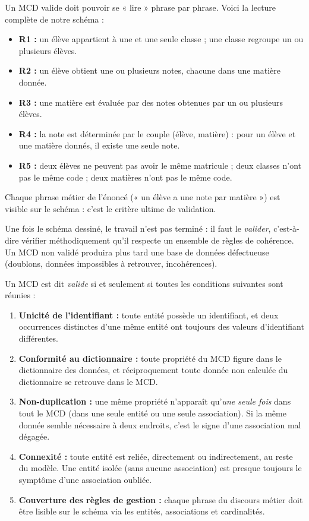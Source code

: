 \documentclass[11pt]{article}
\newcounter{popsec}
\newcounter{popsub}
\newcommand{\courssub}[1]{%
  \stepcounter{popsub}%
  \par\vspace{9pt}\noindent{\popxbold\fontsize{11.5}{13}\selectfont\color{popink}{\color{poporange}\thepopsec.\thepopsub}\hspace{6pt}#1}\par\nopagebreak\vspace{4pt}
}
\begin{document}
\begin{exemplebox}
Un MCD valide doit pouvoir se « lire » phrase par phrase. Voici la lecture complète de notre schéma :
\begin{itemize}
\item \textbf{R1 :} un élève appartient à une et une seule classe ; une classe regroupe un ou plusieurs élèves.
\item \textbf{R2 :} un élève obtient une ou plusieurs notes, chacune dans une matière donnée.
\item \textbf{R3 :} une matière est évaluée par des notes obtenues par un ou plusieurs élèves.
\item \textbf{R4 :} la note est déterminée par le couple (élève, matière) : pour un élève et une matière donnés, il existe une seule note.
\item \textbf{R5 :} deux élèves ne peuvent pas avoir le même matricule ; deux classes n'ont pas le même code ; deux matières n'ont pas le même code.
\end{itemize}
Chaque phrase métier de l'énoncé (« un élève a une note par matière ») est visible sur le schéma : c'est le critère ultime de validation.
\end{exemplebox}

\courssub{Les règles de validation d'un MCD}

Une fois le schéma dessiné, le travail n'est pas terminé : il faut le \emph{valider}, c'est-à-dire vérifier méthodiquement qu'il respecte un ensemble de règles de cohérence. Un MCD non validé produira plus tard une base de données défectueuse (doublons, données impossibles à retrouver, incohérences).

\begin{propriete}
Un MCD est dit \emph{valide} si et seulement si toutes les conditions suivantes sont réunies :
\begin{enumerate}
\item \textbf{Unicité de l'identifiant :} toute entité possède un identifiant, et deux occurrences distinctes d'une même entité ont toujours des valeurs d'identifiant différentes.
\item \textbf{Conformité au dictionnaire :} toute propriété du MCD figure dans le dictionnaire des données, et réciproquement toute donnée non calculée du dictionnaire se retrouve dans le MCD.
\item \textbf{Non-duplication :} une même propriété n'apparaît qu'\emph{une seule fois} dans tout le MCD (dans une seule entité ou une seule association). Si la même donnée semble nécessaire à deux endroits, c'est le signe d'une association mal dégagée.
\item \textbf{Connexité :} toute entité est reliée, directement ou indirectement, au reste du modèle. Une entité isolée (sans aucune association) est presque toujours le symptôme d'une association oubliée.
\item \textbf{Couverture des règles de gestion :} chaque phrase du discours métier doit être lisible sur le schéma via les entités, associations et cardinalités.
\end{enumerate}
\end{propriete}
\end{document}
